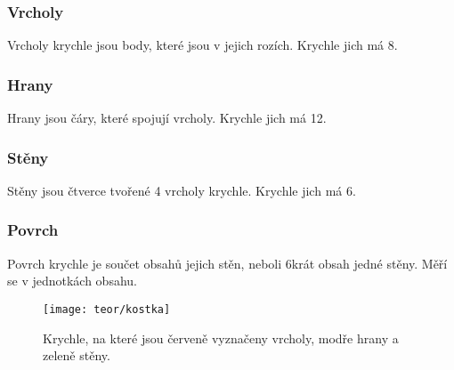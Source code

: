\subsubsection{Vrcholy}
Vrcholy krychle jsou body, které jsou v jejich rozích. Krychle jich má 8.

\subsubsection{Hrany}
Hrany jsou čáry, které spojují vrcholy. Krychle jich má 12.

\subsubsection{Stěny}
Stěny jsou čtverce tvořené 4 vrcholy krychle. Krychle jich má 6.

\subsubsection{Povrch}
Povrch krychle je součet obsahů jejich stěn, neboli 6krát obsah jedné stěny. Měří se v jednotkách obsahu.

\begin{figure}[h]
    \caption{Krychle, na které jsou červeně vyznačeny vrcholy, modře hrany a zeleně stěny.}
    \centering
    \texttt{[image: teor/kostka]}
\end{figure}


